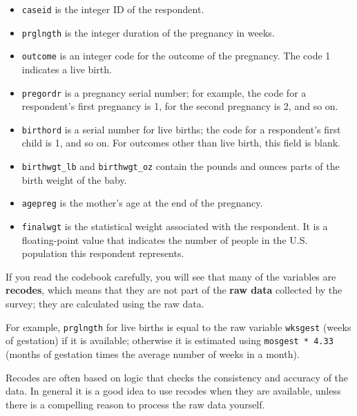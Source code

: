 \documentclass[12pt]{book}
\begin{document}
\begin{itemize}

\item {\tt caseid} is the integer ID of the respondent.

\item {\tt prglngth} is the integer duration of the pregnancy in weeks.

\item {\tt outcome} is an integer code for the outcome of the
  pregnancy.  The code 1 indicates a live birth.

\item {\tt pregordr} is a pregnancy serial number; for example, the
  code for a respondent's first pregnancy is 1, for the second
  pregnancy is 2, and so on.

\item {\tt birthord} is a serial number for live
  births; the code for a respondent's first child is 1, and so on.
  For outcomes other than live birth, this field is blank.

\item \verb"birthwgt_lb" and \verb"birthwgt_oz" contain the pounds and
  ounces parts of the birth weight of the baby.

\item {\tt agepreg} is the mother's age at the end of the pregnancy.

\item {\tt finalwgt} is the statistical weight associated with the
  respondent.  It is a floating-point value that indicates the number
  of people in the U.S. population this respondent represents.

\end{itemize}

If you read the codebook carefully, you will see that many of the
variables are {\bf recodes}, which means that they are not part of the
{\bf raw data} collected by the survey; they are calculated using
the raw data.   

For example, {\tt prglngth} for live births is equal to the raw
variable {\tt wksgest} (weeks of gestation) if it is available;
otherwise it is estimated using {\tt mosgest * 4.33} (months of
gestation times the average number of weeks in a month).

Recodes are often based on logic that checks the consistency and
accuracy of the data.  In general it is a good idea to use recodes
when they are available, unless there is a compelling reason to
process the raw data yourself.
\end{document}
